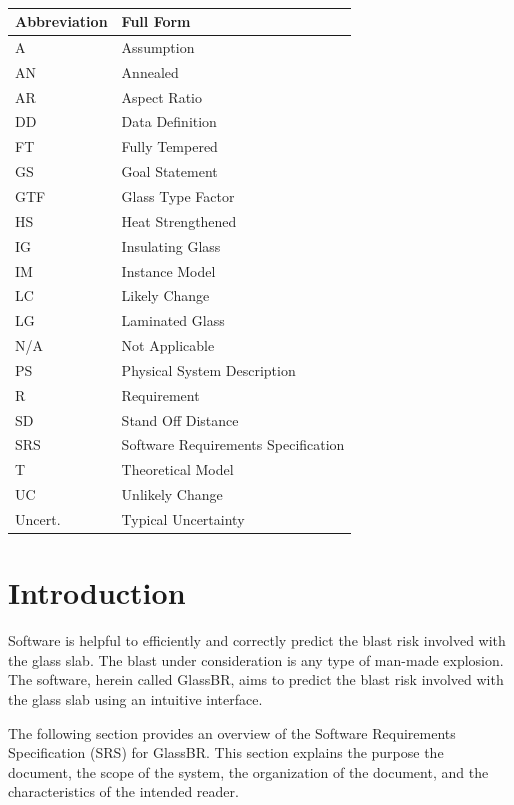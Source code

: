 \documentclass[12pt]{article}
\newcommand{\progname}{GlassBR}
\begin{document}
~\newline \renewcommand{\arraystretch}{1.2}
\noindent 
\begin{tabular}{l l } \toprule
  \textbf{Abbreviation} & \textbf{Full Form}\\
  \midrule
  A & Assumption\\
  AN & Annealed\\
  AR & Aspect Ratio\\
  DD & Data Definition\\
  FT & Fully Tempered\\
  GS & Goal Statement\\
  GTF & Glass Type Factor\\
  HS & Heat Strengthened \\
  IG & Insulating Glass \\
  IM & Instance Model\\
  LC & Likely Change\\
  LG & Laminated Glass\\
  N/A & Not Applicable\\
  PS & Physical System Description\\
  R & Requirement\\
  SD & Stand Off Distance\\
  SRS & 	Software Requirements Specification\\
  T & Theoretical Model\\
  UC & Unlikely Change\\
  Uncert. & 	Typical Uncertainty\\
  \bottomrule
\end{tabular}

\section{Introduction}

Software is helpful to efficiently and correctly predict the blast risk involved
with the glass slab. The blast under consideration is any type of man-made
explosion. The software, herein called \progname, aims to predict the blast risk
involved with the glass slab using an intuitive interface.  

The following section provides an overview of the Software Requirements Specification (SRS)
for \progname.  This section explains the purpose the document, the scope of 
the system, the organization of the document, and the characteristics of 
the intended reader.
\end{document}
